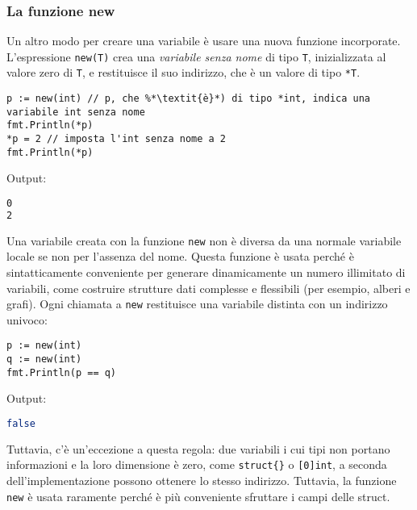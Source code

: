 \documentclass[../../../thesis.tex]{subfiles}
\begin{document}
    \subsubsection{La funzione new}
    Un altro modo per creare una variabile è usare una nuova funzione incorporate.
    L'espressione \verb"new(T)" crea una \textit{variabile senza nome} di tipo \verb"T", inizializzata al valore zero di \verb"T", e restituisce il suo indirizzo, che è un valore di tipo \verb"*T".
    \begin{lstlisting}[frame = single, label = {lst:lstlisting1-3-3.1}]
p := new(int) // p, che %*\textit{è}*) di tipo *int, indica una variabile int senza nome
fmt.Println(*p)
*p = 2 // imposta l'int senza nome a 2
fmt.Println(*p)
    \end{lstlisting}
    Output:
    \begin{lstlisting}[language = bash, frame = L, label = {lst:lstlisting1-3-3.2}]
0
2
    \end{lstlisting}
    Una variabile creata con la funzione \verb"new" non è diversa da una normale variabile locale se non per l'assenza del nome.
    Questa funzione è usata perché è sintatticamente conveniente per generare dinamicamente un numero illimitato di variabili, come costruire strutture dati complesse e flessibili (per esempio, alberi e grafi).
    Ogni chiamata a \verb"new" restituisce una variabile distinta con un indirizzo univoco:
    \begin{lstlisting}[frame = single, label = {lst:lstlisting1-3-3.3}]
p := new(int)
q := new(int)
fmt.Println(p == q)
    \end{lstlisting}
    Output:
    \begin{lstlisting}[language = bash, frame = L, label = {lst:lstlisting1-3-3.4}]
false
    \end{lstlisting}
    Tuttavia, c'è un'eccezione a questa regola: due variabili i cui tipi non portano informazioni e la loro dimensione è zero, come \verb"struct{}" o \verb"[0]int", a seconda dell'implementazione possono ottenere lo stesso indirizzo.
    Tuttavia, la funzione \verb"new" è usata raramente perché è più conveniente sfruttare i campi delle struct.
\end{document}
